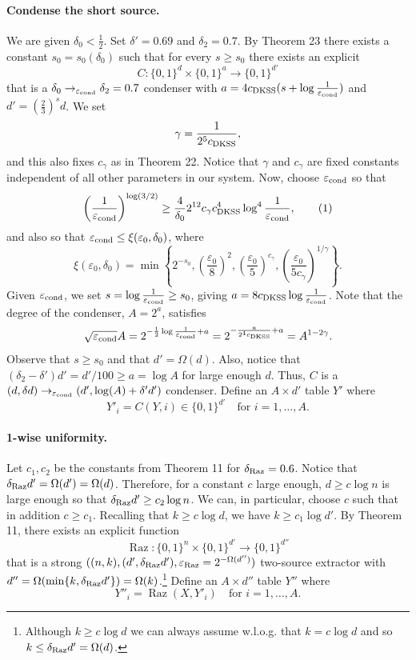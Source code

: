 \documentclass[10pt,a4paper]{article}
\DeclareMathOperator{\Raz}{Raz}
\begin{document}
\paragraph{Condense the short source.} We are given $\delta_0<\frac12$. Set $\delta'=0.69$ and $\delta_2=0.7$.
By Theorem 23 there exists a constant $s_0=s_0(\delta_0)$ such that for every $s\ge s_0$ there exists an explicit
\[C:\{0,1\}^d\times\{0,1\}^a\to\{0,1\}^{d'}\]
that is a $\delta_0\to_{\varepsilon_{\rm cond}}\delta_2=0.7$ condenser with $a=4c_{\rm DKSS}(s+\log\frac1{\varepsilon_{\rm cond}})$ and $d'=(\frac23)^sd$.
We set
\[\gamma=\frac1{2^5c_{\rm DKSS}},\]
and this also fixes $c_\gamma$ as in Theorem 22. Notice that $\gamma$ and $c_\gamma$ are fixed constants independent of all other parameters in our system.
Now, choose $\varepsilon_{\rm cond}$ so that
\begin{equation}\left(\frac1{\varepsilon_{\rm cond}}\right)^{\log(3/2)}\ge\frac4{\delta_0}2^{12}c_\gamma c_{\rm DKSS}^4\log^4\frac1{\varepsilon_{\rm cond}},\tag{1}\label{eq:cond}\end{equation}
and also so that $\varepsilon_{\rm cond}\le\xi(\varepsilon_0,\delta_0)$, where
\begin{equation}\xi(\varepsilon_0,\delta_0)=\min\left\{2^{-s_0},\left(\frac{\varepsilon_0}8\right)^2,\left(\frac{\varepsilon_0}5\right)^{c_\gamma},\left(\frac{\varepsilon_0}{5c_\gamma}\right)^{1/\gamma}\right\}.\tag{2}\label{eq:xi}\end{equation}
Given $\varepsilon_{\rm cond}$, we set $s=\log\frac1{\varepsilon_{\rm cond}}\ge s_0$, giving $a=8c_{\rm DKSS}\log\frac1{\varepsilon_{\rm cond}}$. Note that the degree of the condenser, $A=2^a$, satisfies
\[\sqrt{\varepsilon_{\rm cond}}A=2^{-\frac12\log\frac1{\varepsilon_{\rm cond}}+a}=2^{-\frac a{2^4c_{\rm DKSS}}+a}=A^{1-2\gamma}.\]
Observe that $s\ge s_0$ and that $d'=\Omega(d)$. Also, notice that $(\delta_2-\delta')d'=d'/100\ge a=\log A$ for large enough $d$. Thus, $C$ is a $(d,\delta d)\to_{\varepsilon_{\rm cond}}(d',\log(A)+\delta'd')$ condenser.
Define an $A\times d'$ table $Y'$ where
\[Y'_i=C(Y,i)\in\{0,1\}^{d'}\quad\text{for }i=1,\ldots,A.\]
\paragraph{1-wise uniformity.} Let $c_1,c_2$ be the constants from Theorem 11 for $\delta_{\rm Raz}=0.6$.
Notice that $\delta_{\rm Raz}d'=\Omega(d')=\Omega(d)$. Therefore, for a constant $c$ large enough, $d\ge c\log n$ is large enough so that $\delta_{\rm Raz}d'\ge c_2\log n$. We can, in particular, choose $c$ such that in addition $c\ge c_1$. Recalling that $k\ge c\log d$, we have $k\ge c_1\log d'$. By Theorem 11, there exists an explicit function
\[\Raz:\{0,1\}^n\times\{0,1\}^{d'}\to\{0,1\}^{d''}\]
that is a strong $((n,k),(d',\delta_{\rm Raz}d'),\varepsilon_{\rm Raz}=2^{-\Omega(d'')})$ two-source extractor with $d''=\Omega(\min\{k,\delta_{\rm Raz}d'\})=\Omega(k)$.\footnote{Although $k\ge c\log d$ we can always assume w.l.o.g. that $k=c\log d$ and so $k\le\delta_{\rm Raz}d'=\Omega(d)$.} Define an $A\times d''$ table $Y''$ where
\[Y''_i=\Raz(X,Y'_i)\quad\text{for }i=1,\ldots,A.\]
\end{document}
